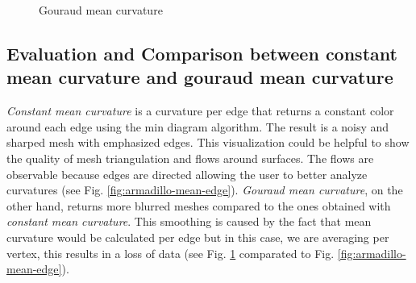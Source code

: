\begin{figure}[!h]
    \endminipage
    \caption{Gouraud mean curvature} \label{fig:armadillo-mean-vertex}
\end{figure}


\subsection{Evaluation and Comparison between constant mean curvature and gouraud mean curvature}
\textit{Constant mean curvature} is a curvature per
edge that returns a constant color around each edge
using the min diagram algorithm. The result is a noisy and sharped mesh with emphasized edges. This visualization could be helpful to show the quality of mesh triangulation and flows around surfaces. The flows are observable because edges are directed allowing the user to better analyze curvatures (see Fig. \ref{fig:armadillo-mean-edge}). \textit{Gouraud mean curvature}, on the other hand, returns more blurred meshes compared to the ones obtained with  \textit{constant mean curvature}. This smoothing is caused by the fact that mean curvature would be calculated per edge but in this case, we are averaging per vertex, this results in a loss of data (see Fig. \ref{fig:armadillo-mean-vertex} comparated to Fig. \ref{fig:armadillo-mean-edge}).
